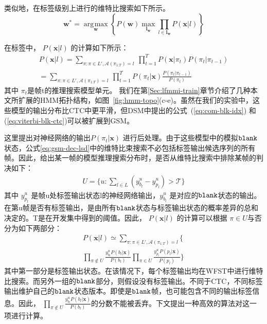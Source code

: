 类似地，在标签级别上进行的维特比搜索如下所示。
\begin{equation} \label{eq:gsm-dec-lsd}
   \mathbf{w}^* = \mathop{\arg\!\max}\limits_\mathbf{w} \left\{
        P(\mathbf{w})
        \mathop{\max}\limits_{\mathbf{l}_\mathbf{w}}  \prod_{l\in\mathbf{l}_\mathbf{w}} P(\mathbf{x}|l)\right\}
     \end{equation}

在标签中， $P(\mathbf{x}|l)$ 的计算如下所示：
\begin{equation} \label{eq:viterbi-blk-gsm}
  \begin{split}
        P(\mathbf{x}|l)
        = \sum_{\pi:\pi \in L',\mathcal{A}(\pi_{1\mathord{:}T})=l}
          \ \prod_{t=1}^{T} P(\mathbf{x}|\pi_t)P(\pi_t|\pi_{t-1})\\
= \sum_{\pi:\pi \in L',\mathcal{A}(\pi_{1\mathord{:}T})=l}
          \ \prod_{t=1}^{T} P(\pi_t|\mathbf{x})\frac{P(\pi_t|\pi_{t-1})}{P(\pi_t)}
        \end{split}
       \end{equation}  
其中 $\pi_t $是帧t的推理搜索模型单元。
我们在第\ref{Sec:lfmmi-train}章节介绍了几种本文所扩展的HMM拓扑结构，如图~\ref{fig:hmm-topo}(c-e)。虽然在我们的实验中，这些模型的输出分布比CTC中更平滑，但DSM中提出的公式~(\ref{eq:com-blk-idx}) 和 (\ref{eq:viterbi-blk-ctc})可以被扩展到GSM。


这里提出对神经网络的输出$P(\pi_t|\mathbf{x})$ 进行后处理。由于这些模型中的模拟$\tt blank$状态，公式\ref{eq:gsm-dec-lsd}中的维特比束搜索不必包括标签输出候选序列的所有帧。因此，给出某一帧的模型推理搜索分布时，是否从维特比搜索中排除某帧的判决如下：
  \begin{equation} 
       \label{eq:com-blk-idx-gsm}
       \begin{split}
U=\{u:\sum_{l\in L}(y^{u}_{b_l}-y^{u}_{p_l})> \mathcal{T}\}
\end{split}
\end{equation}
其中 $y^{u}_{p_l}$ 是帧u处标签输出状态l的神经网络输出，$y^{u}_{b_l}$ 是对应的$\tt blank$状态的输出。在第u帧是否有标签输出，是由所有$\tt blank$状态与标签输出状态的概率差异的总和决定的。T是在开发集中得到的阈值。因此， $P(\mathbf{x}|l)$  的计算可以根据 $\pi\in U$与否分为如下两部分：
\begin{equation} \label{eq:viterbi-blk-hmm2}
  \begin{split}
P(\mathbf{x}|l)
\simeq\sum_{\pi:\pi \in L',\mathcal{A}(\pi_{1\mathord{:}T})=l}
         \{\   \\ %
         \prod_{\pi\not\in U}\frac{y_{b_l}^u P(b_l|\mathbf{x})}{P(b_l)} \prod_{\pi\in U}\frac{y_{p_l}^u P(p_l|\mathbf{x})}{P(p_l)}
         \}
         \end{split}
       \end{equation}   
其中第一部分是标签输出状态。在该情况下，每个标签输出均在WFST中进行维特比搜索。而另外一组的$\tt blank$部分，则假设没有标签输出。不同于CTC，不同标签输出维护自己的$\tt blank$状态版本。即使是$\tt blank$帧，也可能包含不同的输出标签信息。因此， $\prod_{\pi\not\in U}\frac{y_{b_l}^u P(b_l|\mathbf{x})}{P(b_l)}$的分数不能被丢弃。下文提出一种高效的算法对这一项进行计算。

